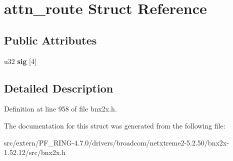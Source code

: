 \hypertarget{structattn__route}{
\section{attn\_\-route Struct Reference}
\label{structattn__route}
}
\subsection*{Public Attributes}
\begin{DoxyCompactItemize}
\item 
\hypertarget{structattn__route_a35e3d03eadbf438ebb08efacdf2c19eb}{
u32 {\bfseries sig} \mbox{[}4\mbox{]}}
\label{structattn__route_a35e3d03eadbf438ebb08efacdf2c19eb}

\end{DoxyCompactItemize}


\subsection{Detailed Description}


Definition at line 958 of file bnx2x.h.



The documentation for this struct was generated from the following file:\begin{DoxyCompactItemize}
\item 
src/extern/PF\_\-RING-\/4.7.0/drivers/broadcom/netxtreme2-\/5.2.50/bnx2x-\/1.52.12/src/bnx2x.h\end{DoxyCompactItemize}
